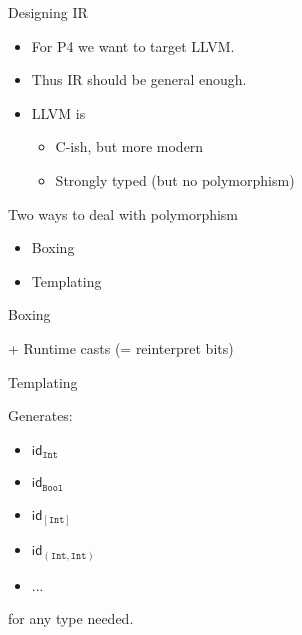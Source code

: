 \documentclass[14pt]{beamer}
\title{\splang}
\author{Wouter Geraedts \and Joshua Moerman}
\institute{Radboud Universiteit Nijmegen}
\date{}
\newcommand{\llvm}{\textsc{LLVM}\xspace}
\begin{document}
\begin{frame}
	\titlepage
\end{frame}

\begin{frame}
	Designing IR
	\bigskip

	\begin{itemize}
		\item For P4 we want to target \llvm.
		\item Thus IR should be general enough.
		\item \llvm is
			\begin{itemize}
				\item C-ish, but more modern
				\item Strongly typed (but no polymorphism)
			\end{itemize}
	\end{itemize}

	
\end{frame}

\begin{frame}
	Two ways to deal with polymorphism
	
	\begin{itemize}
		\item Boxing
		\item Templating
	\end{itemize}
\end{frame}

\begin{frame}
	Boxing
	\bigskip
	
	
	+ Runtime casts (= reinterpret bits)
\end{frame}

\begin{frame}
	Templating
	\bigskip
	
	
	Generates:
	\begin{itemize}
		\item $\mathsf{id}_{\mathtt{Int}}$
		\item $\mathsf{id}_{\mathtt{Bool}}$
		\item $\mathsf{id}_{[\mathtt{Int}]}$
		\item $\mathsf{id}_{(\mathtt{Int}, \mathtt{Int})}$
		\item ...
	\end{itemize}
	
	for any type needed.
\end{frame}
\end{document}
